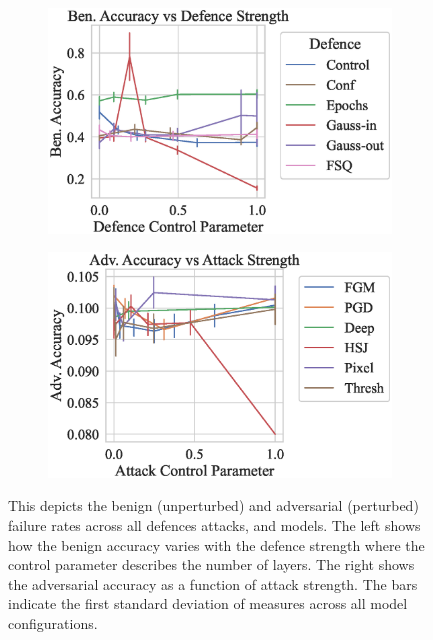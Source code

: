 \begin{figure}[!h]
    \centering
    \begin{subfigure}
        \centering
        \includegraphics[trim={0 10pt 0 10pt},clip,width=.45\textwidth]{mnist/def_param_vs_accuracy.eps}
    \end{subfigure}
    \begin{subfigure}
        \centering
        \includegraphics[trim={0 10pt 0 10pt},clip,width=.45\textwidth]{mnist/atk_param_vs_accuracy.eps}
    \end{subfigure}
    \caption{This depicts the benign (unperturbed) and adversarial (perturbed) failure rates across all defences attacks, and models. The left shows how the benign accuracy varies with the defence strength where the control parameter describes the number of layers. The right shows the adversarial accuracy as a function of attack strength. The bars indicate the first standard deviation of measures across all model configurations.}
    \label{fig:mnist_strength}
\end{figure}

